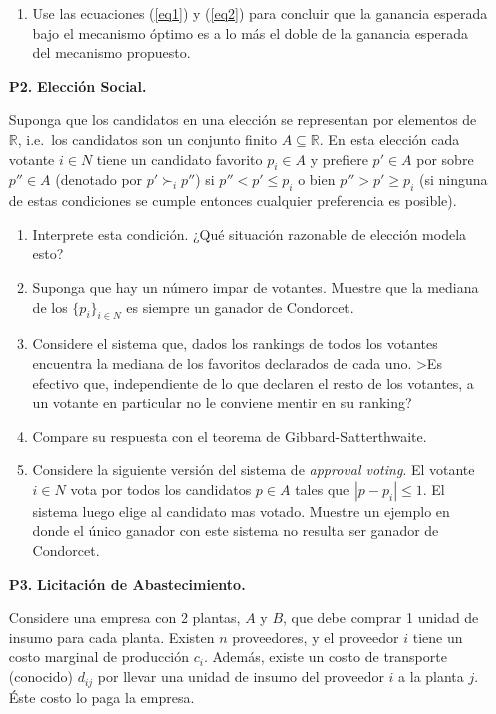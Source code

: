 \documentclass[11pt, spanish]{article}
\theoremstyle{plain}
\newcommand{\R}{\mathds{R}}
\begin{document}
\begin{itemize}
\begin{enumerate}
  \item Use las ecuaciones (\ref{eq1}) y (\ref{eq2}) para concluir que la ganancia esperada bajo el mecanismo
    óptimo es a lo más el doble de la ganancia esperada
    del mecanismo
    propuesto.
\end{enumerate}


  \item[\textbf{P2.}] {\bf Elección Social.}
  
Suponga que los candidatos en una elecci\'on se representan por
elementos de $\R$, i.e.\ los candidatos son un conjunto finito $A
\subseteq \R$. En esta elecci\'on cada votante $i\in N$ tiene un
candidato favorito $p_i\in A$ y prefiere $p'\in A$ por sobre $p''\in
A$ (denotado por $p' \succ_i p''$) si $p''<p'\le p_i$ o bien
$p''>p'\ge p_i$ (si ninguna de estas condiciones se cumple entonces
cualquier preferencia es posible).

\begin{enumerate}
\item Interprete esta condición. ¿Qué situación razonable de elección
modela esto?
\item Suponga que hay un número impar de votantes. Muestre que la
mediana de los $\{p_i\}_{i \in {N}}$ es siempre un ganador de
Condorcet.
\item Considere el sistema que, dados los rankings de todos los
votantes encuentra la mediana de los favoritos declarados de cada uno.
>Es efectivo que, independiente de lo que declaren el resto de los
votantes, a un votante en particular no le conviene mentir en su
ranking?
\item Compare su respuesta con el teorema de Gibbard-Satterthwaite.
\item Considere la siguiente versión del sistema de \emph{approval
voting}. El votante $i\in N$ vota por todos los candidatos $p\in A$
tales que $|{p-p_i}| \le 1$. El sistema luego elige al candidato mas
votado. Muestre un ejemplo en donde el \'unico ganador con este
sistema no resulta ser ganador de Condorcet.
\end{enumerate}

  \item[\textbf{P3.}] {\bf Licitaci\'on de Abastecimiento.} 
  
  Considere una empresa con 2 plantas, $A$ y $B$,
que debe comprar 1 unidad de insumo para cada planta. Existen $n$
proveedores, y el proveedor $i$ tiene un costo marginal de
producci\'on $c_i$. Adem\'as, existe un costo de transporte (conocido)
$d_{ij}$ por llevar una unidad de insumo del  proveedor $i$ a la
planta $j$. \'Este costo lo paga la empresa.



\end{itemize}
\end{document}
